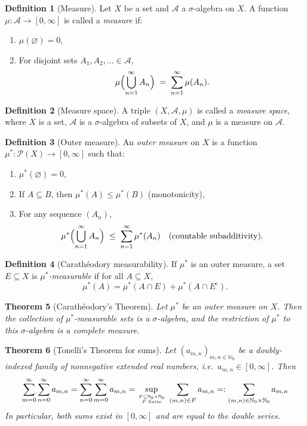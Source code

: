 \documentclass{article}
\theoremstyle{plain}
\newtheorem{thm}{Theorem}[section]
\theoremstyle{definition}
\newtheorem{defn}[thm]{Definition}
\theoremstyle{remark}
\begin{document}
\begin{defn}[Measure]
Let $X$ be a set and $\mathcal{A}$ a $\sigma$-algebra on $X$. A function $\mu:\mathcal{A}\to [0,\infty]$ is called a \emph{measure} if:
\begin{enumerate}
  \item $\mu(\varnothing)=0$,
  \item For disjoint sets $A_1,A_2,\dots \in \mathcal{A}$,
  \[
  \mu\Bigl(\bigcup_{n=1}^\infty A_n\Bigr) \;=\; \sum_{n=1}^\infty \mu(A_n).
  \]
\end{enumerate}
\end{defn}

\begin{defn}[Measure space]
A triple $(X,\mathcal{A},\mu)$ is called a \emph{measure space}, where $X$ is a set, $\mathcal{A}$ is a $\sigma$-algebra of subsets of $X$, and $\mu$ is a measure on $\mathcal{A}$.
\end{defn}

\begin{defn}[Outer measure]
An \emph{outer measure} on $X$ is a function $\mu^*:\mathcal{P}(X)\to[0,\infty]$ such that:
\begin{enumerate}
  \item $\mu^*(\varnothing)=0$,
  \item If $A\subseteq B$, then $\mu^*(A)\le \mu^*(B)$ (monotonicity),
  \item For any sequence $(A_n)$,
  \[
  \mu^*\Bigl(\bigcup_{n=1}^\infty A_n\Bigr) \;\le\; \sum_{n=1}^\infty \mu^*(A_n)
  \quad\text{(countable subadditivity)}.
  \]
\end{enumerate}
\end{defn}

\begin{defn}[Carathéodory measurability]
If $\mu^*$ is an outer measure, a set $E\subseteq X$ is \emph{$\mu^*$-measurable} if for all $A\subseteq X$,
\[
\mu^*(A) = \mu^*(A\cap E) + \mu^*(A\cap E^c).
\]
\end{defn}

\begin{thm}[Carathéodory's Theorem] \label{thm:caratheodory}
Let $\mu^*$ be an outer measure on $X$. Then the collection of $\mu^*$-measurable sets is a $\sigma$-algebra, and the restriction of $\mu^*$ to this $\sigma$-algebra is a complete measure.
\end{thm}

\begin{thm}[Tonelli's Theorem for sums]
\label{thm:tonelli-sums}
Let $(a_{m,n})_{m,n\in\mathbb{N}_0}$ be a doubly-indexed family of nonnegative extended real numbers, i.e.\ $a_{m,n}\in [0,\infty]$. Then
\[
\sum_{m=0}^\infty\sum_{n=0}^\infty a_{m,n}
= \sum_{n=0}^\infty\sum_{m=0}^\infty a_{m,n}
= \sup_{F\subseteq \mathbb{N}_0\times \mathbb{N}_0 \atop F \text{ finite}}
     \;\sum_{(m,n)\in F} a_{m,n} =: \sum \limits _{(m,n) \in \mathbb{N}_0 \times \mathbb{N}_0} a_{m,n}
\]
In particular, both sums exist in $[0,\infty]$ and are equal to the double series.
\end{thm}
\end{document}
